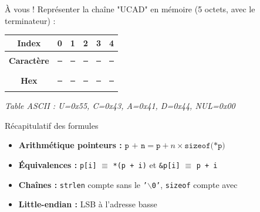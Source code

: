 \documentclass[10pt,a4paper]{article}
\begin{document}
\vspace{1em}

\begin{exercicebox}{À vous !}
Représenter la chaîne "UCAD" en mémoire (5 octets, avec le terminateur) :

\begin{center}
\renewcommand{\arraystretch}{1.5}
\begin{tabular}{|c|c|c|c|c|c|}
\hline
\textbf{Index} & 0 & 1 & 2 & 3 & 4 \\
\hline
\textbf{Caractère} & \rule{0.8cm}{0.4pt} & \rule{0.8cm}{0.4pt} & \rule{0.8cm}{0.4pt} & \rule{0.8cm}{0.4pt} & \rule{0.8cm}{0.4pt} \\
\hline
\textbf{Hex} & \rule{0.8cm}{0.4pt} & \rule{0.8cm}{0.4pt} & \rule{0.8cm}{0.4pt} & \rule{0.8cm}{0.4pt} & \rule{0.8cm}{0.4pt} \\
\hline
\end{tabular}
\end{center}

\textit{Table ASCII : U=0x55, C=0x43, A=0x41, D=0x44, NUL=0x00}
\end{exercicebox}

\vspace{2em}
\begin{infobox}{Récapitulatif des formules}
\begin{itemize}
    \item \textbf{Arithmétique pointeurs :} $\texttt{p + n} = \texttt{p} + n \times \texttt{sizeof(*p)}$
    \item \textbf{Équivalences :} \texttt{p[i]} $\equiv$ \texttt{*(p + i)} et \texttt{\&p[i]} $\equiv$ \texttt{p + i}
    \item \textbf{Chaînes :} \texttt{strlen} compte sans le \texttt{'$\backslash$0'}, \texttt{sizeof} compte avec
    \item \textbf{Little-endian :} LSB à l'adresse basse
\end{itemize}
\end{infobox}
\end{document}
